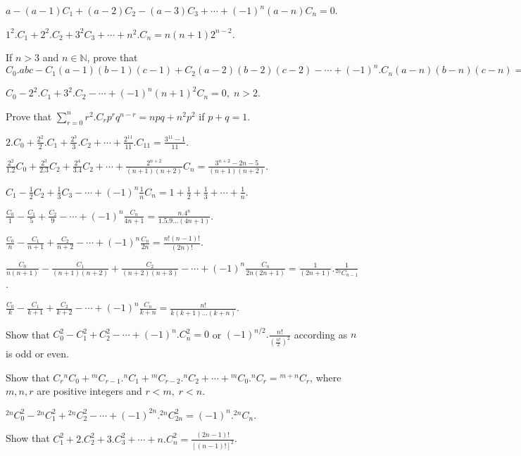 \item $a - (a - 1)C_1 + (a - 2)C_2 - (a - 3)C_3 + \cdots + (-1)^n(a - n)C_n = 0$.
\item $1^2.C_1 + 2^2.C_2 + 3^2C_3 + \cdots + n^2.C_n = n(n + 1)2^{n - 2}$.
\item If $n>3$ and $n\in\mathbb{N}$, prove that $C_0.abc - C_1(a - 1)(b - 1)(c - 1) + C_2(a - 2)(b - 2)(c -2)- \cdots +
  (-1)^n.C_n(a - n)(b - n)(c - n) = 0$
\item $C_0 - 2^2.C_1 + 3^2.C_2 - \cdots + (-1)^n(n + 1)^2C_n = 0,\;n>2$.
\item Prove that $\displaystyle\sum_{r=0}^nr^2.C_rp^rq^{n- r} = npq + n^2p^2$ if $p + q = 1$.
\item $2.C_0 + \frac{2^2}{2}.C_1 + \frac{2^3}{3}.C_2 + \cdots + \frac{2^{11}}{11}.C_{11} = \frac{3^{11} -
    1}{11}$.
\item $\frac{2^2}{1.2}C_0 + \frac{2^3}{2.3}C_2 + \frac{2^4}{3.4}C_2 + \cdots + \frac{2^{n + 2}}{(n + 1)(n +
    2)}C_n = \frac{3^{n + 2} - 2n -5}{(n + 1)(n + 2)}$.
\item $C_1 - \frac{1}{2}C_2 + \frac{1}{3}C_3 - \cdots + (-1)^n\frac{1}{n}C_n = 1 + \frac{1}{2} + \frac{1}{3} + \cdots +
  \frac{1}{n}$.
\item $\frac{C_0}{1} - \frac{C_1}{5} + \frac{C_2}{9} - \cdots + (-1)^n\frac{C_n}{4n + 1} = \frac{n.4^n}{1.5.9\ldots (4n + 1)}$.
\item $\frac{C_0}{n} - \frac{C_1}{n+ 1} + \frac{C_2}{n + 2} - \cdots + (-1)^n\frac{C_n}{2n} = \frac{n!(n - 1)!}{(2n)!}$.
\item $\frac{C_0}{n(n + 1)} - \frac{C_1}{(n + 1)(n+ 2)} + \frac{C_2}{(n + 2)(n + 3)} - \cdots + (-1)^n\frac{C_n}{2n(2n + 1)} =
  \frac{1}{(2n + 1)}.\frac{1}{{}^{2n}C_{n - 1}}$.
\item $\frac{C_0}{k} - \frac{C_1}{k + 1} + \frac{C_2}{k + 2} - \cdots + (-1)^n\frac{C_n}{k + n} = \frac{n!}{k(k + 1)\ldots(k + n)}$.
\item Show that $C_0^2 - C_1^2 + C_2^2 - \cdots + (-1)^n.C_n^2 = 0$ or $(-1)^{n/2}.\frac{n!}{\left(\frac{n!}{2}\right)^2}$
  according as $n$ is odd or even.
\item Show that $C_r{}^nC_0 + {}^mC_{r-1}.{}^nC_1 + {}^mC_{r-2}.{}^nC_2 + \cdots + {}^mC_0.{}^nC_r = {}^{m + n}C_r$, where $m,
  n, r$ are positive integers and $r<m,\;r<n$.
\item ${}^{2n}C_0^2 - {}^{2n}C_1^2 + {}^{2n}C_2^2 - \cdots + (-1)^{2n}.{}^{2n}C_{2n}^2 = (-1)^n.{}^{2n}C_n$.
\item Show that $C_1^2 + 2.C_2^2 + 3.C_3^2 + \cdots + n.C_n^2 = \frac{(2n - 1)!}{[(n - 1)!]^2}$.
